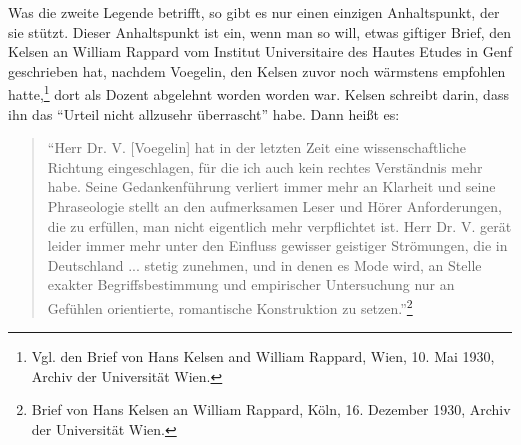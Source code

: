 \documentclass[12pt,a4paper,ngerman]{article}
\begin{document}
Was die zweite Legende betrifft, so gibt es nur einen einzigen
Anhaltspunkt, der sie stützt. Dieser Anhaltspunkt ist ein, wenn man so
will, etwas giftiger Brief, den Kelsen an William Rappard vom Institut
Universitaire des Hautes Etudes in Genf geschrieben hat, nachdem
Voegelin, den Kelsen zuvor noch wärmstens empfohlen
hatte,\footnote{Vgl. den Brief von Hans Kelsen and William Rappard,
  Wien, 10. Mai 1930, Archiv der Universität Wien.} dort als Dozent
abgelehnt worden worden war. Kelsen schreibt darin, dass ihn das
"`Urteil nicht allzusehr überrascht"' habe. Dann heißt es:

\begin{quote}
  "`Herr Dr. V. [Voegelin] hat in der letzten Zeit eine
  wissenschaftliche Richtung eingeschlagen, für die ich auch kein
  rechtes Verständnis mehr habe.  Seine Gedankenführung verliert immer
  mehr an Klarheit und seine Phraseologie stellt an den aufmerksamen
  Leser und Hörer Anforderungen, die zu erfüllen, man nicht eigentlich
  mehr verpflichtet ist. Herr Dr.  V. gerät leider immer mehr unter
  den Einfluss gewisser geistiger Strömungen, die in Deutschland ...
  stetig zunehmen, und in denen es Mode wird, an Stelle exakter
  Begriffsbestimmung und empirischer Untersuchung nur an Gefühlen
  orientierte, romantische Konstruktion zu setzen."'\footnote{Brief
    von Hans Kelsen an William Rappard, Köln, 16. Dezember 1930,
    Archiv der Universität Wien.}
\end{quote}
\end{document}
